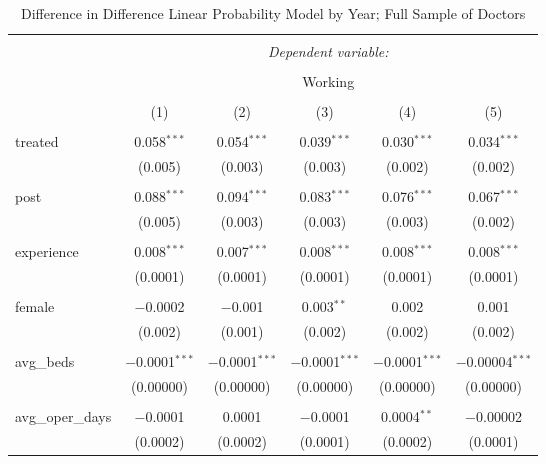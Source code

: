 
\begin{table}[!htbp] \centering 
  \caption{Difference in Difference Linear Probability Model by Year; Full Sample of Doctors} 
  \label{} 
\scriptsize 
\begin{tabular}{@{\extracolsep{0pt}}lccccc} 
\\[-1.8ex]\hline 
\hline \\[-1.8ex] 
 & \multicolumn{5}{c}{\textit{Dependent variable:}} \\ 
\cline{2-6} 
\\[-1.8ex] & \multicolumn{5}{c}{Working} \\ 
\\[-1.8ex] & (1) & (2) & (3) & (4) & (5)\\ 
\hline \\[-1.8ex] 
 treated & 0.058$^{***}$ & 0.054$^{***}$ & 0.039$^{***}$ & 0.030$^{***}$ & 0.034$^{***}$ \\ 
  & (0.005) & (0.003) & (0.003) & (0.002) & (0.002) \\ 
  & & & & & \\ 
 post & 0.088$^{***}$ & 0.094$^{***}$ & 0.083$^{***}$ & 0.076$^{***}$ & 0.067$^{***}$ \\ 
  & (0.005) & (0.003) & (0.003) & (0.003) & (0.002) \\ 
  & & & & & \\ 
 experience & 0.008$^{***}$ & 0.007$^{***}$ & 0.008$^{***}$ & 0.008$^{***}$ & 0.008$^{***}$ \\ 
  & (0.0001) & (0.0001) & (0.0001) & (0.0001) & (0.0001) \\ 
  & & & & & \\ 
 female & $-$0.0002 & $-$0.001 & 0.003$^{**}$ & 0.002 & 0.001 \\ 
  & (0.002) & (0.001) & (0.002) & (0.002) & (0.002) \\ 
  & & & & & \\ 
 avg\_beds & $-$0.0001$^{***}$ & $-$0.0001$^{***}$ & $-$0.0001$^{***}$ & $-$0.0001$^{***}$ & $-$0.00004$^{***}$ \\ 
  & (0.00000) & (0.00000) & (0.00000) & (0.00000) & (0.00000) \\ 
  & & & & & \\ 
 avg\_oper\_days & $-$0.0001 & 0.0001 & $-$0.0001 & 0.0004$^{**}$ & $-$0.00002 \\ 
  & (0.0002) & (0.0002) & (0.0001) & (0.0002) & (0.0001) \\ 

\end{tabular}
\end{table}
